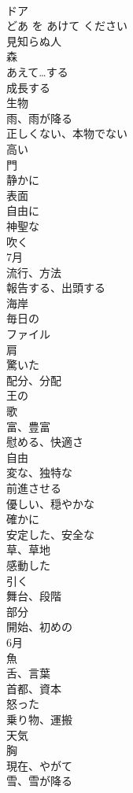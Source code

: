 \documentclass[8pt]{extreport}
\begin{document}
\begin{CJK}{UTF8}{min}
\\	ドア 
\\	どあ を あけて ください			
\\	見知らぬ人
\\	森
\\	あえて…する
\\	成長する
\\	生物
\\	雨、雨が降る
\\	正しくない、本物でない
\\	高い
\\	門
\\	静かに
\\	表面
\\	自由に
\\	神聖な
\\	吹く
\\	7月
\\	流行、方法
\\	報告する、出頭する
\\	海岸
\\	毎日の
\\	ファイル
\\	肩
\\	驚いた
\\	配分、分配
\\	王の
\\	歌
\\	富、豊富
\\	慰める、快適さ
\\	自由
\\	変な、独特な
\\	前進させる
\\	優しい、穏やかな
\\	確かに
\\	安定した、安全な
\\	草、草地
\\	感動した
\\	引く
\\	舞台、段階
\\	部分
\\	開始、初めの
\\	6月
\\	魚
\\	舌、言葉
\\	首都、資本
\\	怒った
\\	乗り物、運搬
\\	天気
\\	胸
\\	現在、やがて
\\	雪、雪が降る

\end{CJK}
\end{document}
